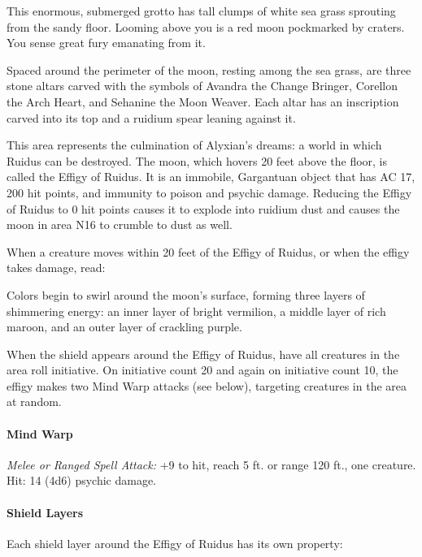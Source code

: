 \documentclass[10pt,a4paper,twoside,twocolumn,openany,nodeprecatedcode]{dndbook}
\begin{document}
\begin{DndReadAloud}{}
This enormous, submerged grotto has tall clumps of white sea grass sprouting from the sandy floor. Looming above you is a red moon pockmarked by craters. You sense great fury emanating from it.

Spaced around the perimeter of the moon, resting among the sea grass, are three stone altars carved with the symbols of Avandra the Change Bringer, Corellon the Arch Heart, and Sehanine the Moon Weaver. Each altar has an inscription carved into its top and a ruidium spear leaning against it.

\end{DndReadAloud}

This area represents the culmination of Alyxian's dreams: a world in which Ruidus can be destroyed. The moon, which hovers 20 feet above the floor, is called the Effigy of Ruidus. It is an immobile, Gargantuan object that has AC 17, 200 hit points, and immunity to poison and psychic damage. Reducing the Effigy of Ruidus to 0 hit points causes it to explode into ruidium dust and causes the moon in area N16 to crumble to dust as well.

When a creature moves within 20 feet of the Effigy of Ruidus, or when the effigy takes damage, read:

\begin{DndReadAloud}{}
Colors begin to swirl around the moon's surface, forming three layers of shimmering energy: an inner layer of bright vermilion, a middle layer of rich maroon, and an outer layer of crackling purple.

\end{DndReadAloud}

When the shield appears around the Effigy of Ruidus, have all creatures in the area roll initiative. On initiative count 20 and again on initiative count 10, the effigy makes two Mind Warp attacks (see below), targeting creatures in the area at random.

\begin{DndComment}{}
  \paragraph{Mind Warp}
\textsl{Melee or Ranged Spell Attack:} +9 to hit, reach 5 ft. or range 120 ft., one creature. Hit: 14 (4d6) psychic damage.

\end{DndComment}

\paragraph{Shield Layers}
Each shield layer around the Effigy of Ruidus has its own property:
\end{document}
